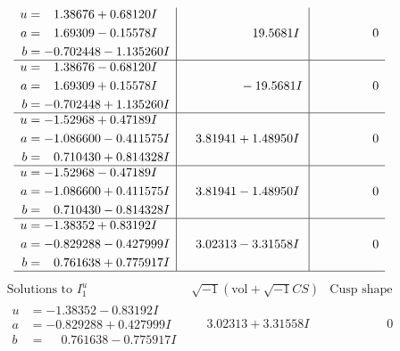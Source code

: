 \documentclass[1p]{elsarticle_modified}
\theoremstyle{definition}
\newcommand{\I}{\sqrt{-1}}
\begin{document}
$$\begin{array}{c|c|c}
\begin{aligned}
u &= \phantom{-}1.38676 + 0.68120 I \\
a &= \phantom{-}1.69309 - 0.15578 I \\
b &= -0.702448 - 1.135260 I\end{aligned}
 & \phantom{-0.000000 -}19.5681 I & \phantom{-0.000000 } 0 \\ \hline\begin{aligned}
u &= \phantom{-}1.38676 - 0.68120 I \\
a &= \phantom{-}1.69309 + 0.15578 I \\
b &= -0.702448 + 1.135260 I\end{aligned}
 & \phantom{-0.000000 } -19.5681 I & \phantom{-0.000000 } 0 \\ \hline\begin{aligned}
u &= -1.52968 + 0.47189 I \\
a &= -1.086600 - 0.411575 I \\
b &= \phantom{-}0.710430 + 0.814328 I\end{aligned}
 & \phantom{-}3.81941 + 1.48950 I & \phantom{-0.000000 } 0 \\ \hline\begin{aligned}
u &= -1.52968 - 0.47189 I \\
a &= -1.086600 + 0.411575 I \\
b &= \phantom{-}0.710430 - 0.814328 I\end{aligned}
 & \phantom{-}3.81941 - 1.48950 I & \phantom{-0.000000 } 0 \\ \hline\begin{aligned}
u &= -1.38352 + 0.83192 I \\
a &= -0.829288 - 0.427999 I \\
b &= \phantom{-}0.761638 + 0.775917 I\end{aligned}
 & \phantom{-}3.02313 - 3.31558 I & \phantom{-0.000000 } 0\\
 \hline 
 \end{array}$$\newpage$$\begin{array}{c|c|c}  
\text{Solutions to }I^u_{1}& \I (\text{vol} + \sqrt{-1}CS) & \text{Cusp shape}\\
 \hline 
\begin{aligned}
u &= -1.38352 - 0.83192 I \\
a &= -0.829288 + 0.427999 I \\
b &= \phantom{-}0.761638 - 0.775917 I\end{aligned}
 & \phantom{-}3.02313 + 3.31558 I & \phantom{-0.000000 } 0 \\ \hline\begin{aligned}

\end{aligned}
\end{array}$$
\end{document}
